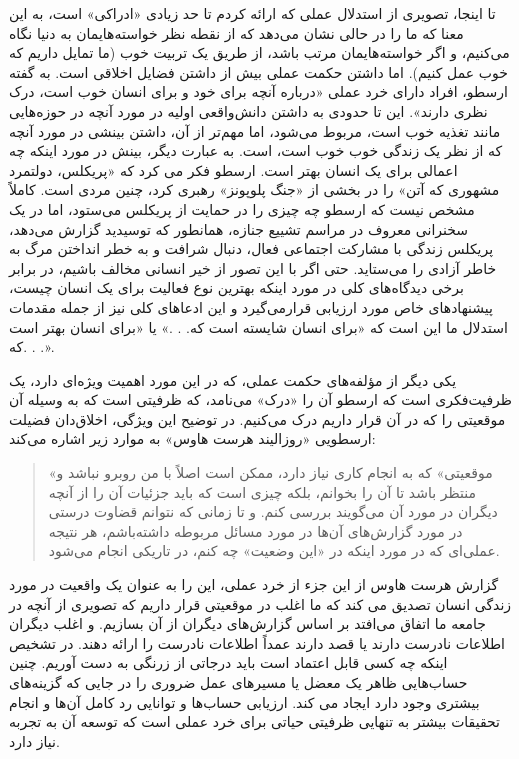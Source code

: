 تا اینجا، تصویری از استدلال عملی که ارائه کردم تا حد زیادی «ادراکی» است، به این معنا که ما را در حالی نشان می‌دهد که از نقطه نظر خواسته‌هایمان به دنیا نگاه می‌کنیم، و اگر خواسته‌هایمان مرتب باشد، از طریق یک تربیت خوب (ما تمایل داریم که خوب عمل کنیم).
اما داشتن حکمت عملی بیش از داشتن فضایل اخلاقی است.
به گفته ارسطو، افراد دارای خرد عملی «درباره آنچه برای خود و برای انسان خوب است، درک نظری دارند».
این تا حدودی به داشتن دانش‌واقعی اولیه در مورد آنچه در حوزه‌هایی مانند تغذیه خوب است، مربوط می‌شود، اما مهم‌تر از آن، داشتن بینشی در مورد آنچه که از نظر یک زندگی خوب خوب است، است.
به عبارت دیگر، بینش در مورد اینکه چه اعمالی برای یک انسان بهتر است.
ارسطو فکر می کرد که «پریکلس، دولتمرد مشهوری که آتن» را در بخشی از «جنگ پلوپونز» رهبری کرد، چنین مردی است.
کاملاً مشخص نیست که ارسطو چه چیزی را در حمایت از پریکلس می‌ستود، اما در یک سخنرانی معروف در مراسم تشییع جنازه، همانطور که توسیدید گزارش می‌دهد، پریکلس زندگی با مشارکت اجتماعی فعال، دنبال شرافت و به خطر انداختن مرگ به خاطر آزادی را می‌ستاید.
حتی اگر با این تصور از خیر انسانی مخالف باشیم، در برابر برخی دیدگاه‌های کلی در مورد اینکه بهترین نوع فعالیت برای یک انسان چیست، پیشنهادهای خاص مورد ارزیابی قرار‌می‌گیرد و این ادعاهای کلی نیز از جمله مقدمات استدلال ما این است که «برای انسان شایسته است که.
. .» یا «برای انسان بهتر است که.
. .».

یکی دیگر از مؤلفه‌های حکمت عملی، که در این مورد اهمیت ویژه‌ای دارد، یک ظرفیت‌فکری است که ارسطو آن را «درک» می‌نامد، که ظرفیتی است که به وسیله آن موقعیتی را که در آن قرار داریم درک می‌کنیم.
در توضیح این ویژگی، اخلاق‌دان فضیلت ارسطویی «روزالیند هرست هاوس» به موارد زیر اشاره می‌کند:



\begin{quote}
    «موقعیتی» که به انجام کاری نیاز دارد، ممکن است اصلاً با من روبرو نباشد و منتظر باشد تا آن را بخوانم، بلکه چیزی است که باید جزئیات آن را از آنچه دیگران در مورد آن می‌گویند بررسی کنم.
    و تا زمانی که نتوانم قضاوت درستی در مورد گزارش‌های آن‌ها در مورد مسائل مربوطه داشته‌باشم، هر نتیجه عملی‌ای که در مورد اینکه در «این وضعیت» چه کنم، در تاریکی انجام می‌شود.
    \newline
\end{quote}

گزارش هرست هاوس از این جزء از خرد عملی، این را به عنوان یک واقعیت در مورد زندگی انسان تصدیق می کند که ما اغلب در موقعیتی قرار داریم که تصویری از آنچه در جامعه ما اتفاق می‌افتد بر اساس گزارش‌های دیگران از آن بسازیم.
و اغلب دیگران اطلاعات نادرست دارند یا قصد دارند عمداً اطلاعات نادرست را ارائه دهند.
در تشخیص اینکه چه کسی قابل اعتماد است باید درجاتی از زرنگی به دست آوریم.
چنین حساب‌هایی ظاهر یک معضل یا مسیرهای عمل ضروری را در جایی که گزینه‌های بیشتری وجود دارد ایجاد می کند.
ارزیابی حساب‌ها و توانایی رد کامل آن‌ها و انجام تحقیقات بیشتر به تنهایی ظرفیتی حیاتی برای خرد عملی است که توسعه آن به تجربه نیاز دارد.

